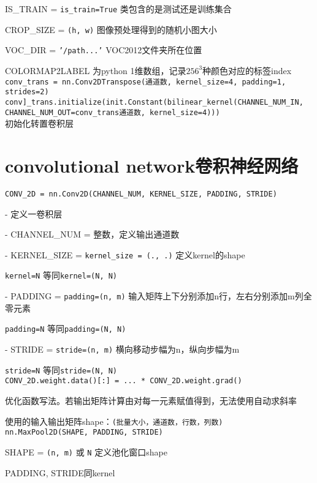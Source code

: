 \documentclass[UTF8]{ctexart}
\begin{document}
  IS\_TRAIN = \texttt{is\_train=True} 类包含的是测试还是训练集合

  CROP\_SIZE = \texttt{(h, w)} 图像预处理得到的随机小图大小

  VOC\_DIR = \texttt{'/path...'} VOC2012文件夹所在位置

  COLORMAP2LABEL 为python 1维数组，记录$256^3$种颜色对应的标签index\\
\texttt{conv\_trans = nn.Conv2DTranspose(通道数, kernel\_size=4, padding=1, strides=2)}\\
\texttt{conv]\_trans.initialize(init.Constant(bilinear\_kernel(CHANNEL_NUM_IN, CHANNEL_NUM_OUT=conv\_trans通道数, kernel\_size=4)))}\\

  初始化转置卷积层
\section{convolutional network卷积神经网络}
\noindent \texttt{CONV\_2D = nn.Conv2D(CHANNEL\_NUM, KERNEL\_SIZE, PADDING, STRIDE)}

  - 定义一卷积层

  - CHANNEL\_NUM = 整数，定义输出通道数

  - KERNEL\_SIZE = \texttt{kernel\_size = (., .)} 定义kernel的shape

  \quad \texttt{kernel=N} 等同\texttt{kernel=(N, N)}
  
  - PADDING = \texttt{padding=(n, m)}  输入矩阵上下分别添加n行，左右分别添加m列全零元素

  \quad \texttt{padding=N} 等同\texttt{padding=(N, N)}
  
  - STRIDE = \texttt{stride=(n, m)} 横向移动步幅为n，纵向步幅为m
  
  \quad \texttt{stride=N} 等同\texttt{stride=(N, N)}\\
\texttt{CONV\_2D.weight.data()[:] = ... * CONV\_2D.weight.grad()}

  优化函数写法。若输出矩阵计算由对每一元素赋值得到，无法使用自动求斜率
  
  使用的输入输出矩阵shape：\texttt{(批量大小，通道数，行数，列数)}\\
\texttt{nn.MaxPool2D(SHAPE, PADDING, STRIDE)}

  SHAPE = \texttt{(n, m)} 或 \texttt{N} 定义池化窗口shape

  PADDING, STRIDE同kernel
\end{document}
